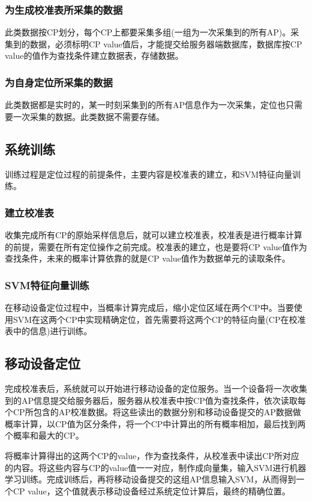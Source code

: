 \documentclass[UTF8, twocolumn ]{ctexart}
\begin{document}
\subsubsection{为生成校准表所采集的数据}
此类数据按CP划分，每个CP上都要采集多组(一组为一次采集到的所有AP)。采集到的数据，必须标明CP value值后，才能提交给服务器端数据库，数据库按CP value的值作为查找条件建立数据表，存储数据。
\subsubsection{为自身定位所采集的数据}
此类数据都是实时的，某一时刻采集到的所有AP信息作为一次采集，定位也只需要一次采集的数据。此类数据不需要存储。
\subsection{系统训练}
训练过程是定位过程的前提条件，主要内容是校准表的建立，和SVM特征向量训练。
\subsubsection{建立校准表}
收集完成所有CP的原始采样信息后，就可以建立校准表，校准表是进行概率计算的前提，需要在所有定位操作之前完成。校准表的建立，也是要将CP value值作为查找条件，未来的概率计算依靠的就是CP value值作为数据单元的读取条件。
\subsubsection{SVM特征向量训练}
在移动设备定位过程中，当概率计算完成后，缩小定位区域在两个CP中。当要使用SVM在这两个CP中实现精确定位，首先需要将这两个CP的特征向量(CP在校准表中的信息)进行训练。

\subsection{移动设备定位}
完成校准表后，系统就可以开始进行移动设备的定位服务。当一个设备将一次收集到的AP信息提交给服务器后，服务器从校准表中按CP值为查找条件，依次读取每个CP所包含的AP校准数据。将这些读出的数据分别和移动设备提交的AP数据做概率计算，以CP值为区分条件，将一个CP中计算出的所有概率相加，最后找到两个概率和最大的CP。
\par
将概率计算得出的这两个CP的value，作为查找条件，从校准表中读出CP所对应的内容。将这些内容与CP的value值一一对应，制作成向量集，输入SVM进行机器学习训练。完成训练后，再将移动设备提交的这组AP信息输入SVM，从而得到一个CP value，这个值就表示移动设备经过系统定位计算后，最终的精确位置。

\end{document}
